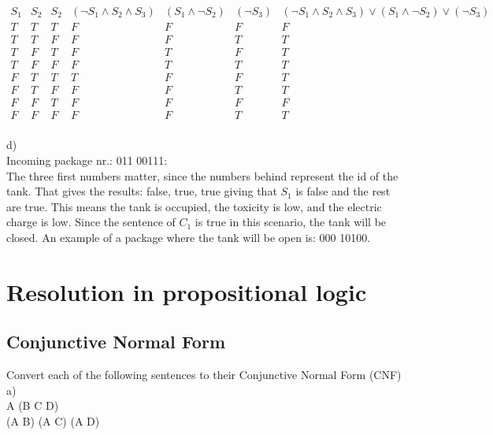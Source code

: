 \documentclass{article}
\begin{document}
\begin{displaymath}
\begin{array}{|c|c|c|c|c|c|c|c|}

S_1 & 
S_2 & 
S_2 &
(\neg S_1 \wedge S_2 \wedge S_3) & 
(S_1 \wedge \neg S_2) &
(\neg S_3) &
(\neg S_1 \wedge S_2 \wedge S_3) \vee (S_1 \wedge \neg S_2) \vee (\neg S_3)
\\ %
\hline  %
T & T & T & F & F & F & F\\
T & T & F & F & F & T & T\\
T & F & T & F & T & F & T\\
T & F & F & F & T & T & T\\
F & T & T & T & F & F & T\\
F & T & F & F & F & T & T\\
F & F & T & F & F & F & F\\
F & F & F & F & F & T & T\\


\end{array}
\end{displaymath}

d)\\

\noindent Incoming package nr.: 011 00111:\\
The three first numbers matter, since the numbers behind represent the id of the tank.
That gives the results: false, true, true giving that $S_1$ is false and the rest are true. This means the tank is occupied, the toxicity is low, and the electric charge is low. Since the sentence of $C_1$ is true in this scenario, the tank will be closed. An example of a package where the tank will be open is: 000 10100.


\section{Resolution in propositional logic}

\subsection{Conjunctive Normal Form}

Convert each of the following sentences to their Conjunctive Normal Form (CNF)\\

a)\\
A \vee (B \wedge C \wedge \neg D)\\
(A \vee B) \wedge (A \vee C) \wedge (A \vee \neg D)\\
\end{document}
